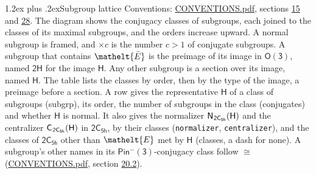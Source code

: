 \documentclass[10pt,a4paper]{article}
\makeatletter
\renewcommand\section{\@startsection{section}{1}{\z@}{-3ex plus -1ex minus -.2ex}%
  {1.2ex plus .2ex}{\normalfont\large\sffamily\bfseries\color{parttitle}}}
\numberwithin{equation}{section}
\newcommand{\eltfont}[1]{{\let\sigma\eltsigma\mathelt{#1}}}
\newcommand{\grp}[1]{\mathsf{#1}}
\newcommand{\cls}[1]{\eltfont{#1}}
\newcommand{\elt}[1]{\eltfont{#1}}
\newcommand{\samecls}{\cong}
\newcommand{\barred}[1]{\bar{#1}}
\newcommand{\hairsp}{\mkern1mu}
\makeatother
\begin{document}
\section{Subgroup lattice}\label{s:subgroups}
Conventions: \href{../../CONVENTIONS.pdf}{CONVENTIONS.pdf}, sections \href{../../../rotation/CONVENTIONS.pdf\#conv.15}{15} and \href{../../CONVENTIONS.pdf\#conv.28}{28}.
The diagram shows the conjugacy classes of subgroups, each joined to the classes of its maximal subgroups, and the orders increase upward. \label{n:index.conjugates.c}A normal subgroup is framed, and ${\times}c$ is the number $c > 1$ of conjugate subgroups. \label{n:group.H}A subgroup that contains $\elt{\barred{E}}$ is the preimage of its image in $\grp{O(3)}$, named $\grp{2H}$ for the image $\grp{H}$. Any other subgroup is a section over its image, named $\grp{H}$. The table lists the classes by order, then by the type of the image, a preimage before a section. \label{n:head.subgroup}\label{n:head.order}\label{n:head.conjugates}\label{n:head.normal}A row gives the representative $\grp{H}$ of a class of subgroups (subgrp), its order, the number of subgroups in the class (conjugates) and whether $\grp{H}$ is normal. \label{n:group.normalizer}\label{n:group.centralizer}\label{n:head.classes}It also gives the normalizer $\grp{N}_{\hairsp \grp{2C_{5h}}}(\grp{H})$ and the centralizer $\grp{C}_{\hairsp \grp{2C_{5h}}}(\grp{H})$ in $\grp{2C_{5h}}$, by their classes (\texttt{normalizer}, \texttt{centralizer}), and the classes of $\grp{2C_{5h}}$ other than $\cls{E}$ met by $\grp{H}$ (classes, a dash for none). A subgroup's other names in its \href{Pinminus3.pdf}{$\grp{Pin^{-}(3)}$}-conjugacy class follow $\samecls$ (\href{../../CONVENTIONS.pdf}{CONVENTIONS.pdf}, section \href{../../CONVENTIONS.pdf\#conv.20.2}{20.2}).
\begin{center}
\end{center}
\end{document}
